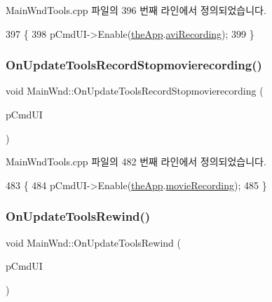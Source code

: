 Main\+Wnd\+Tools.\+cpp 파일의 396 번째 라인에서 정의되었습니다.


\begin{DoxyCode}
397 \{
398   pCmdUI->Enable(\mbox{\hyperlink{_v_b_a_8cpp_a8095a9d06b37a7efe3723f3218ad8fb3}{theApp}}.\mbox{\hyperlink{class_v_b_a_a96743b6c6ee2d9b45c52b981136e3738}{aviRecording}});
399 \}
\end{DoxyCode}
\mbox{\label{class_main_wnd_aa72a602faefe912310c776e32445c708}} 
\subsubsection{\texorpdfstring{On\+Update\+Tools\+Record\+Stopmovierecording()}{OnUpdateToolsRecordStopmovierecording()}}
{\footnotesize\ttfamily void Main\+Wnd\+::\+On\+Update\+Tools\+Record\+Stopmovierecording (\begin{DoxyParamCaption}\item[{C\+Cmd\+UI $\ast$}]{p\+Cmd\+UI }\end{DoxyParamCaption})\hspace{0.3cm}{\ttfamily [protected]}}



Main\+Wnd\+Tools.\+cpp 파일의 482 번째 라인에서 정의되었습니다.


\begin{DoxyCode}
483 \{
484   pCmdUI->Enable(\mbox{\hyperlink{_v_b_a_8cpp_a8095a9d06b37a7efe3723f3218ad8fb3}{theApp}}.\mbox{\hyperlink{class_v_b_a_a7fbf39fb4604c00c8ad139b2e27f3756}{movieRecording}});
485 \}
\end{DoxyCode}
\mbox{\label{class_main_wnd_a540e2396272cb013f8490fe1a6c6e27c}} 
\subsubsection{\texorpdfstring{On\+Update\+Tools\+Rewind()}{OnUpdateToolsRewind()}}
{\footnotesize\ttfamily void Main\+Wnd\+::\+On\+Update\+Tools\+Rewind (\begin{DoxyParamCaption}\item[{C\+Cmd\+UI $\ast$}]{p\+Cmd\+UI }\end{DoxyParamCaption})\hspace{0.3cm}{\ttfamily [protected]}}



